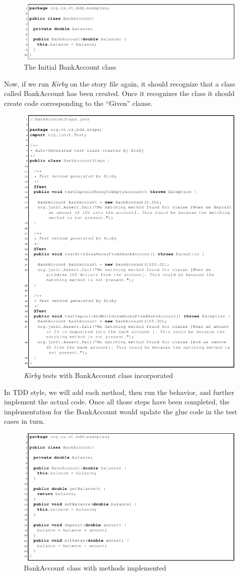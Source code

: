 \documentclass[conference, onecolumn, a4, 12pt]{IEEEtran}
\begin{document}
\begin{figure}
	\centering
	\includegraphics[width=0.7\linewidth]{BankAccount_class}
	\caption{The Initial BankAccount class}
	\label{fig:bankaccountclass}
\end{figure}

Now, if we run \textit{Kirby} on the story file again, it should recognize that a class called BankAccount has been created. Once it recognizes the class it should create code corresponding to the “Given” clause.

\begin{figure}
	\centering
	\includegraphics[width=0.7\linewidth]{Second_kirby_generated_test_class}
	\caption{\textit{Kirby} tests with BankAccount class incorporated}
	\label{fig:secondkirbygeneratedtestclass}
\end{figure}

In TDD style, we will add each method, then run the behavior, and further implement
the actual code. Once all those steps have been completed, the implementation for the BankAccount would update the glue code in the test cases in turn.

\begin{figure}
	\centering
	\includegraphics[width=0.7\linewidth]{BankAccount_class_implemented}
	\caption{BankAccount class with methods implemented}
	\label{fig:bankaccountclassimplemented}
\end{figure}
\end{document}
